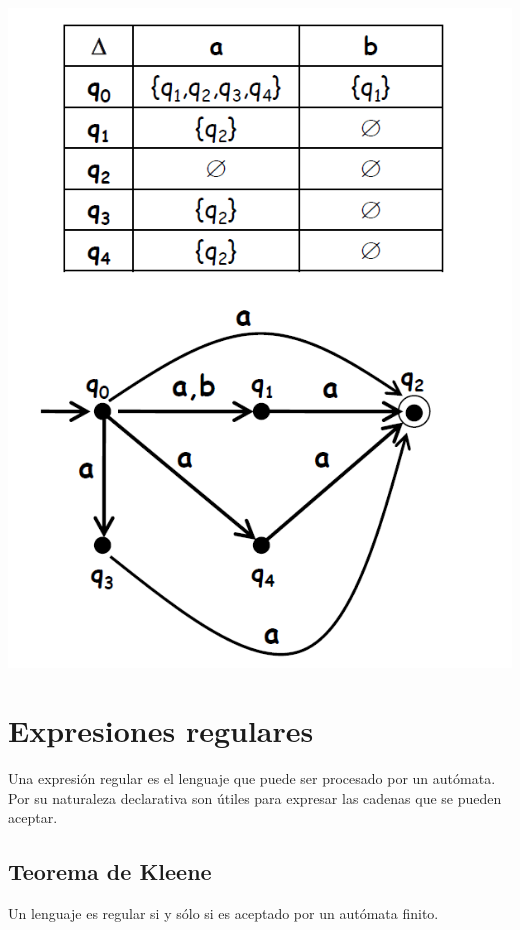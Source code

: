 \documentclass[a4paper,9pt]{extarticle}
\newenvironment{Figure}
  {\par\medskip\noindent\minipage{\linewidth}}
  {\endminipage\par\medskip}
\begin{document}
\begin{multicols*}{2}
\begin{Figure}
 \centering
 \includegraphics[scale=0.4]{Eliminar_epsilon_resultado}
\end{Figure}



\section{Expresiones regulares}
Una expresión regular es el lenguaje que puede ser procesado por un autómata. Por su naturaleza declarativa son útiles para expresar las cadenas que se pueden aceptar.

\subsection{Teorema de Kleene}
Un lenguaje es regular si y sólo si es aceptado por un autómata finito.


\end{multicols*}
\end{document}
